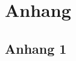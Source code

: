 \section{Anhang}
\appendix 
{}
\renewcommand{\thesubsection}{\Alph{subsection}} %

\subsection{Anhang 1}\label{apx:anhang1}
